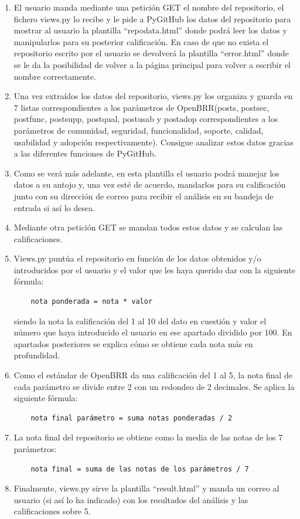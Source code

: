 \documentclass[a4paper, 12pt]{book}
\begin{document}
\begin{enumerate}
	\item El usuario manda mediante una petición GET el nombre del repositorio, el fichero views.py lo recibe y le pide a PyGitHub los datos del repositorio para mostrar al usuario la plantilla ``repo\textunderscore data.html'' donde podrá leer los datos y manipularlos para su posterior calificación. En caso de que no exista el repositorio escrito por el usuario se devolverá la plantilla ``error.html'' donde se le da la posibilidad de volver a la página principal para volver a escribir el nombre correctamente.
	\item Una vez extraídos los datos del repositorio, views.py los organiza y guarda en 7 listas correspondientes a los parámetros de OpenBRR(posts, post\textunderscore sec, post\textunderscore func, post\textunderscore supp, post\textunderscore qual, post\textunderscore usab y post\textunderscore adop correspondientes a los parámetros de comunidad, seguridad, funcionalidad, soporte, calidad, usabilidad y adopción respectivamente). Consigue analizar estos datos gracias a las diferentes funciones de PyGitHub.
	\item Como se verá más adelante, en esta plantilla el usuario podrá manejar los datos a su antojo y, una vez esté de acuerdo, mandarlos para su calificación junto con su dirección de correo para recibir el análisis en su bandeja de entrada si así lo desea.
	\item Mediante otra petición GET se mandan todos estos datos y se calculan las calificaciones.
	\item Views.py puntúa el repositorio en función de los datos obtenidos y/o introducidos por el usuario y el valor que les haya querido dar con la siguiente fórmula: \begin{verbatim}
	nota ponderada = nota * valor
	\end{verbatim}
	siendo la nota la calificación del 1 al 10 del dato en cuestión y valor el número que haya introducido el usuario en ese apartado dividido por 100. En apartados posteriores se explica cómo se obtiene cada nota más en profundidad.
	\item Como el estándar de OpenBRR da una calificación del 1 al 5, la nota final de cada parámetro se divide entre 2 con un redondeo de 2 decimales. Se aplica la siguiente fórmula:
	\begin{verbatim}
	nota final parámetro = suma notas ponderadas / 2
	\end{verbatim}
	\item La nota final del repositorio se obtiene como la media de las notas de los 7 parámetros:
	\begin{verbatim}
	nota final = suma de las notas de los parámetros / 7
	\end{verbatim}
	\item Finalmente, views.py sirve la plantilla ``result.html'' y manda un correo al usuario (si así lo ha indicado) con los resultados del análisis y las calificaciones sobre 5.
\end{enumerate}
\end{document}
